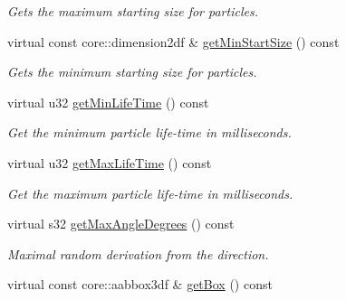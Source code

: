 \begin{DoxyCompactItemize}
\begin{DoxyCompactList}\small\item\em Gets the maximum starting size for particles. \end{DoxyCompactList}\item 
\hypertarget{classirr_1_1scene_1_1_c_particle_box_emitter_a52c8091c97e801c3dc0d645d50b5636a}{virtual const core\-::dimension2df \& \hyperlink{classirr_1_1scene_1_1_c_particle_box_emitter_a52c8091c97e801c3dc0d645d50b5636a}{get\-Min\-Start\-Size} () const }\label{classirr_1_1scene_1_1_c_particle_box_emitter_a52c8091c97e801c3dc0d645d50b5636a}

\begin{DoxyCompactList}\small\item\em Gets the minimum starting size for particles. \end{DoxyCompactList}\item 
\hypertarget{classirr_1_1scene_1_1_c_particle_box_emitter_a8bcf07e8d8c150f812cfd6aa05faffc8}{virtual u32 \hyperlink{classirr_1_1scene_1_1_c_particle_box_emitter_a8bcf07e8d8c150f812cfd6aa05faffc8}{get\-Min\-Life\-Time} () const }\label{classirr_1_1scene_1_1_c_particle_box_emitter_a8bcf07e8d8c150f812cfd6aa05faffc8}

\begin{DoxyCompactList}\small\item\em Get the minimum particle life-\/time in milliseconds. \end{DoxyCompactList}\item 
\hypertarget{classirr_1_1scene_1_1_c_particle_box_emitter_acbf1ee20b45903cfc17e9a526bc6fbd2}{virtual u32 \hyperlink{classirr_1_1scene_1_1_c_particle_box_emitter_acbf1ee20b45903cfc17e9a526bc6fbd2}{get\-Max\-Life\-Time} () const }\label{classirr_1_1scene_1_1_c_particle_box_emitter_acbf1ee20b45903cfc17e9a526bc6fbd2}

\begin{DoxyCompactList}\small\item\em Get the maximum particle life-\/time in milliseconds. \end{DoxyCompactList}\item 
\hypertarget{classirr_1_1scene_1_1_c_particle_box_emitter_aaab6c481a504c1e6f09e106723436347}{virtual s32 \hyperlink{classirr_1_1scene_1_1_c_particle_box_emitter_aaab6c481a504c1e6f09e106723436347}{get\-Max\-Angle\-Degrees} () const }\label{classirr_1_1scene_1_1_c_particle_box_emitter_aaab6c481a504c1e6f09e106723436347}

\begin{DoxyCompactList}\small\item\em Maximal random derivation from the direction. \end{DoxyCompactList}\item 
\hypertarget{classirr_1_1scene_1_1_c_particle_box_emitter_a36f83701f1c7e52e4d75e73b53b3cdc1}{virtual const core\-::aabbox3df \& \hyperlink{classirr_1_1scene_1_1_c_particle_box_emitter_a36f83701f1c7e52e4d75e73b53b3cdc1}{get\-Box} () const }\label{classirr_1_1scene_1_1_c_particle_box_emitter_a36f83701f1c7e52e4d75e73b53b3cdc1}


\end{DoxyCompactItemize}
